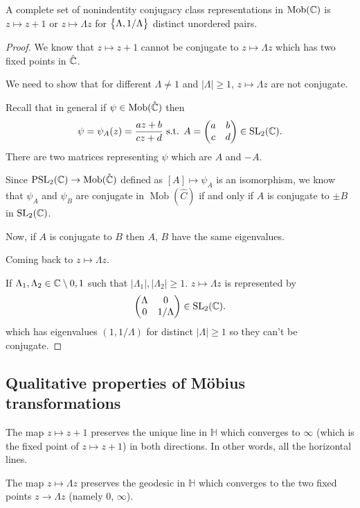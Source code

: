 \documentclass[11pt,a4paper]{article}
\renewcommand{\H}{\mathbb H}
\DeclareMathOperator{\Mob}{Mob}
\DeclareMathOperator{\PSL}{PSL}
\begin{document}
\begin{corollary}
  A complete set of nonindentity conjugacy class representations in $\Mob(\C)$
  is $z \mapsto z + 1$ or $z \mapsto \Lambda z$ for $\set{\Lambda, 1 / \Lambda}$
  distinct unordered pairs.
\end{corollary}
\begin{proof}
  We know that $z \mapsto z + 1$ cannot be conjugate to $z \mapsto \Lambda z$
  which has two fixed points in $\hat {\mathbb{C}}$.

  We need to show that for different $\Lambda \neq 1$ and $|\Lambda| \geq 1$,
  $z \mapsto \Lambda z$ are not conjugate.

  Recall that in general if $\psi \in \Mob(\hat \C)$ then
  \[
    \psi = \psi_A(z) = \frac{a z + b}{c z + d} \text{ s.t. }
    A =
    \begin{pmatrix}
      a & b \\
      c & d
    \end{pmatrix} \in \operatorname{SL}_2(\mathbb{C}).
  \]
  There are two matrices representing $\psi$ which are $A$ and $-A$.

  Since $\PSL_2(\C) \to \Mob(\hat \C)$ defined as $[A] \mapsto \psi_A$
  is an isomorphism, we know that $\psi_A$ and $\psi_B$ are conjugate
  in $\Mob(\hat C)$ if and only if $A$ is conjugate to $\pm B$ in
  $\operatorname{SL}_2(\mathbb{C})$.

  Now, if $A$ is conjugate to $B$ then $A$, $B$ have the same eigenvalues.

  Coming back to $z \mapsto \Lambda z$.

  If $\Lambda_1, \Lambda_2 \in \mathbb{C} \setminus{0,1}$ such that
  $|\Lambda_1|, |\Lambda_2| \geq 1$. $z \mapsto \Lambda z$ is represented
  by
  \[
    \begin{pmatrix}
      \Lambda & 0 \\
      0 & 1 / \Lambda
    \end{pmatrix} \in \operatorname{SL}_2(\mathbb{C}).
  \]
  which has eigenvalues $(1, 1 / \Lambda)$ for distinct $|\Lambda| \geq 1$
  so they can't be conjugate.
\end{proof}

\subsection{Qualitative properties of M\"obius transformations}

The map $z \mapsto z + 1$ preserves the unique line in $\H$ which converges
to $\infty$ (which is the fixed point of $z \mapsto z + 1$) in both directions. 
In other words, all the horizontal lines.

The map $z \mapsto \Lambda z$ preserves the geodesic in $\H$ which converges to
the two fixed points $z \to \Lambda z$ (namely $0$, $\infty$).
\end{document}
